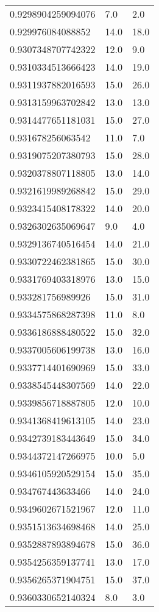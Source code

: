 \begin{center}
\begin{supertabular}[H]{p{0.30\textwidth}p{0.05\textwidth}p{0.05\textwidth}}
0.9298904259094076 & 7.0 & 2.0 \\ 
0.929976084088852 & 14.0 & 18.0 \\ 
0.9307348707742322 & 12.0 & 9.0 \\ 
0.9310334513666423 & 14.0 & 19.0 \\ 
0.9311937882016593 & 15.0 & 26.0 \\ 
0.9313159963702842 & 13.0 & 13.0 \\ 
0.9314477651181031 & 15.0 & 27.0 \\ 
0.931678256063542 & 11.0 & 7.0 \\ 
0.9319075207380793 & 15.0 & 28.0 \\ 
0.9320378807118805 & 13.0 & 14.0 \\ 
0.9321619989268842 & 15.0 & 29.0 \\ 
0.9323415408178322 & 14.0 & 20.0 \\ 
0.9326302635069647 & 9.0 & 4.0 \\ 
0.9329136740516454 & 14.0 & 21.0 \\ 
0.9330722462381865 & 15.0 & 30.0 \\ 
0.9331769403318976 & 13.0 & 15.0 \\ 
0.933281756989926 & 15.0 & 31.0 \\ 
0.9334575868287398 & 11.0 & 8.0 \\ 
0.9336186888480522 & 15.0 & 32.0 \\ 
0.9337005606199738 & 13.0 & 16.0 \\ 
0.9337714401690969 & 15.0 & 33.0 \\ 
0.9338545448307569 & 14.0 & 22.0 \\ 
0.9339856718887805 & 12.0 & 10.0 \\ 
0.9341368419613105 & 14.0 & 23.0 \\ 
0.9342739183443649 & 15.0 & 34.0 \\ 
0.9344372147266975 & 10.0 & 5.0 \\ 
0.9346105920529154 & 15.0 & 35.0 \\ 
0.934767443633466 & 14.0 & 24.0 \\ 
0.9349602671521967 & 12.0 & 11.0 \\ 
0.9351513634698468 & 14.0 & 25.0 \\ 
0.9352887893894678 & 15.0 & 36.0 \\ 
0.9354256359137741 & 13.0 & 17.0 \\ 
0.9356265371904751 & 15.0 & 37.0 \\ 
0.9360330652140324 & 8.0 & 3.0 \\ 

\end{supertabular}
\end{center}
